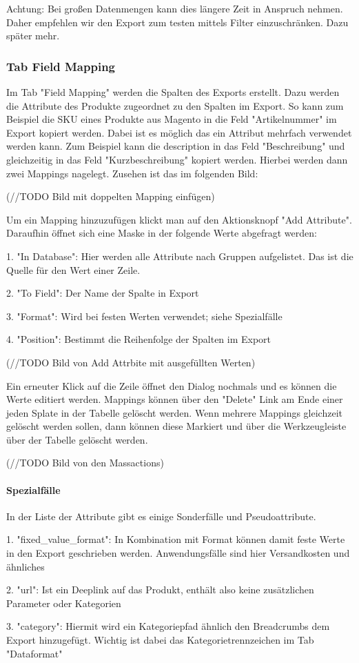 \documentclass[a4paper]{article}
\begin{document}
Achtung: Bei großen Datenmengen kann dies längere Zeit in Anspruch 
nehmen. Daher empfehlen wir den Export zum testen mittels Filter 
einzuschränken. Dazu später mehr.

\subsubsection{Tab Field Mapping}
Im Tab "Field Mapping" werden die Spalten des Exports erstellt. Dazu 
werden die Attribute des Produkte zugeordnet zu den Spalten im Export. 
So kann zum Beispiel die SKU eines Produkte aus Magento in die Feld 
"Artikelnummer" im Export kopiert werden. Dabei ist es möglich das ein 
Attribut mehrfach verwendet werden kann. Zum Beispiel kann die 
description in das Feld "Beschreibung" und gleichzeitig in das Feld 
"Kurzbeschreibung" kopiert werden. Hierbei werden dann zwei Mappings 
nagelegt. Zusehen ist das im folgenden Bild:


(//TODO Bild mit doppelten Mapping einfügen)


Um ein Mapping hinzuzufügen klickt man auf den Aktionsknopf "Add 
Attribute". Daraufhin öffnet sich eine Maske in der folgende Werte 
abgefragt werden:

1. "In Database": Hier werden alle Attribute nach Gruppen aufgelistet. 
Das ist die Quelle für den Wert einer Zeile. 


2. "To Field": Der Name der Spalte in Export


3. "Format": Wird bei festen Werten verwendet; siehe Spezialfälle


4. "Position": Bestimmt die Reihenfolge der Spalten im Export


(//TODO Bild von Add Attrbite mit ausgefüllten Werten)


Ein erneuter Klick auf die Zeile öffnet den Dialog nochmals und es 
können die Werte editiert werden. Mappings können über den "Delete" 
Link am Ende einer jeden Splate in der Tabelle gelöscht werden. Wenn 
mehrere Mappings gleichzeit gelöscht werden sollen, dann können diese 
Markiert und über die Werkzeugleiste über der Tabelle gelöscht werden.


(//TODO Bild von den Massactions)


\paragraph{Spezialfälle}
In der Liste der Attribute gibt es einige Sonderfälle und 
Pseudoattribute.

1. "fixed\_value\_format": In Kombination mit Format können damit feste 
Werte in den Export geschrieben werden. Anwendungsfälle sind hier 
Versandkosten und ähnliches


2. "url": Ist ein Deeplink auf das Produkt, enthält also keine 
zusätzlichen Parameter oder Kategorien


3. "category": Hiermit wird ein Kategoriepfad ähnlich den Breadcrumbs 
dem Export hinzugefügt. Wichtig ist dabei das Kategorietrennzeichen im 
Tab "Dataformat"
\end{document}
